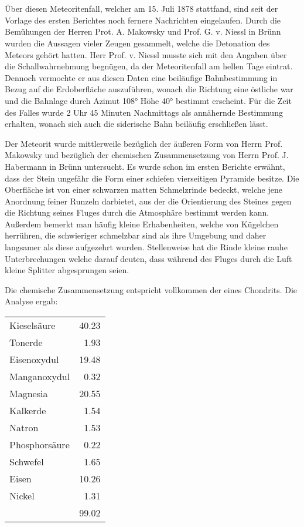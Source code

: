 \documentclass[a4paper, 11pt, oneside]{article}
\begin{document}
\section{}
\paragraph{}
Über diesen Meteoritenfall, welcher am 15. Juli 1878 stattfand, sind seit der Vorlage des ersten Berichtes noch fernere Nachrichten eingelaufen. Durch die Bemühungen der Herren Prot. A. Makowsky und Prof. G. v. Niessl in Brünn wurden die Aussagen vieler Zeugen gesammelt, welche die Detonation des Meteors gehört hatten. Herr Prof. v. Niessl musste sich mit den Angaben über die Schallwahrnehmung begnügen, da der Meteoritenfall am hellen Tage eintrat. Dennoch vermochte er aus diesen Daten eine beiläufige Bahnbestimmung in Bezug auf die Erdoberfläche auszuführen, wonach die Richtung eine östliche war und die Bahnlage durch Azimut 108° Höhe 40° bestimmt erscheint. Für die Zeit des Falles wurde 2 Uhr 45 Minuten Nachmittags als annähernde Bestimmung erhalten, wonach sich auch die siderische Bahn beiläufig erschließen lässt.

Der Meteorit wurde mittlerweile bezüglich der äußeren Form von Herrn Prof. Makowsky und bezüglich der chemischen Zusammensetzung von Herrn Prof. J. Habermann in Brünn untersucht. Es wurde schon im ersten Berichte erwähnt, dass der Stein ungefähr die Form einer schiefen vierseitigen Pyramide besitze. Die Oberfläche ist von einer schwarzen matten Schmelzrinde bedeckt, welche jene Anordnung feiner Runzeln darbietet, aus der die Orientierung des Steines gegen die Richtung seines Fluges durch die Atmosphäre bestimmt werden kann. Außerdem bemerkt man häufig kleine Erhabenheiten, welche von Kügelchen herrühren, die schwieriger schmelzbar sind als ihre Umgebung und daher langsamer als diese aufgezehrt wurden. Stellenweise hat die Rinde kleine rauhe Unterbrechungen welche darauf deuten, dass während des Fluges durch die Luft kleine Splitter abgesprungen seien.

Die chemische Zusammensetzung entspricht vollkommen der eines Chondrits. Die Analyse ergab:
\begin{center}
\begin{tabular}{ l r }
    Kieselsäure & 40.23\\
    Tonerde & 1.93\\
    Eisenoxydul & 19.48\\
    Manganoxydul & 0.32\\
    Magnesia & 20.55\\
    Kalkerde & 1.54\\
    Natron & 1.53\\
    Phosphorsäure & 0.22\\
    Schwefel & 1.65\\
    Eisen & 10.26\\
    Nickel & 1.31\\
     & 99.02\\
\end{tabular}
\end{center}
\end{document}
